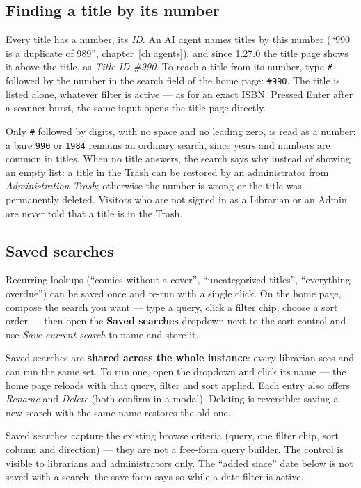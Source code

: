\subsection{Finding a title by its number}\label{sec:title-id-search}

Every title has a number, its \emph{ID}. An AI agent names titles by
this number (``990 is a duplicate of 989'', chapter~\ref{ch:agents}),
and since 1.27.0 the title page shows it above the title, as
\emph{Title ID \#990}. To reach a title from its number, type
\texttt{\#} followed by the number in the search field of the home page:
\texttt{\#990}. The title is listed alone, whatever filter is active ---
as for an exact ISBN. Pressed Enter after a scanner burst, the same
input opens the title page directly.

Only \texttt{\#} followed by digits, with no space and no leading zero,
is read as a number: a bare \texttt{990} or \texttt{1984} remains an
ordinary search, since years and numbers are common in titles. When no
title answers, the search says why instead of showing an empty list: a
title in the Trash can be restored by an administrator from
\emph{Administration \textrightarrow{} Trash}; otherwise the number is
wrong or the title was permanently deleted. Visitors who are not signed
in as a Librarian or an Admin are never told that a title is in the
Trash.

\subsection{Saved searches}\label{sec:saved-searches}

Recurring lookups (``comics without a cover'', ``uncategorized
titles'', ``everything overdue'') can be saved once and re-run with a
single click. On the home page, compose the search you want — type a
query, click a filter chip, choose a sort order — then open the
\textbf{Saved searches} dropdown next to the sort control and use
\emph{Save current search} to name and store it.

Saved searches are \textbf{shared across the whole instance}: every
librarian sees and can run the same set. To run one, open the dropdown
and click its name — the home page reloads with that query, filter and
sort applied. Each entry also offers \emph{Rename} and \emph{Delete}
(both confirm in a modal). Deleting is reversible: saving a new search
with the same name restores the old one.

\begin{note}
Saved searches capture the existing browse criteria (query, one filter
chip, sort column and direction) — they are not a free-form query
builder. The control is visible to librarians and administrators only.
The ``added since'' date below is not saved with a search; the save
form says so while a date filter is active.
\end{note}

